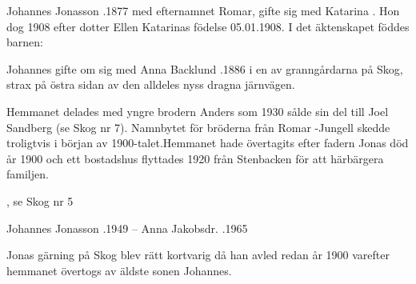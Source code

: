 

Johannes Jonasson .1877 med efternamnet Romar, gifte sig med Katarina . Hon dog 1908 efter dotter Ellen Katarinas födelse 05.01.1908. I det äktenskapet föddes barnen:

\begin{jhchildren}
  \item {}
  \item {}
  \item {}
\end{jhchildren}

Johannes gifte om sig med Anna Backlund .1886 i en av granngårdarna på Skog, strax på östra sidan av den alldeles nyss dragna järnvägen.

Hemmanet delades med yngre brodern Anders som 1930 sålde sin del till Joel Sandberg (se Skog nr 7). Namnbytet för bröderna från Romar -Jungell skedde troligtvis i början av 1900-talet.Hemmanet hade övertagits efter fadern Jonas död år 1900 och ett bostadshus flyttades 1920 från Stenbacken för att härbärgera familjen.

\begin{jhchildren}
  \item {}, se Skog nr 5
  \item {}
  \item {}
  \item {}
\end{jhchildren}

Johannes Jonasson .1949   --   Anna Jakobsdr. .1965


Jonas gärning på Skog blev rätt kortvarig då han avled redan år 1900 varefter hemmanet övertogs av äldste sonen Johannes.

\begin{jhchildren}
  \item {}
  \item {}
  \item {}
  \item {}
  \item {}
  \item {}
  \item {}
\end{jhchildren}


